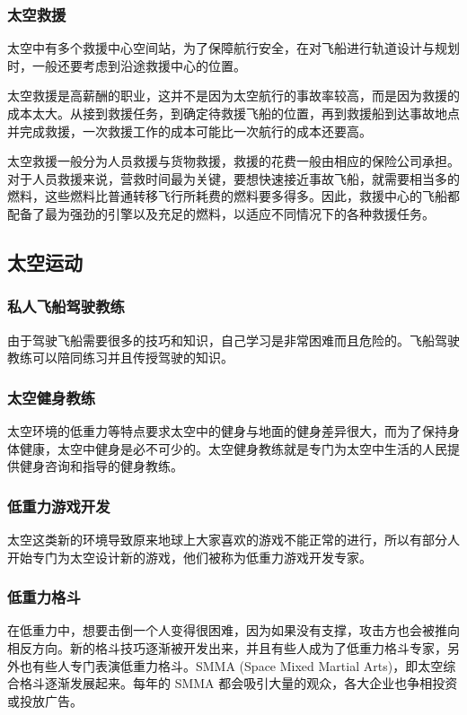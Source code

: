 \documentclass[letterpaper,10pt]{sphinxmanual}
\begin{document}
\subsubsection{太空救援}
\label{profession:id10}
太空中有多个救援中心空间站，为了保障航行安全，在对飞船进行轨道设计与规划时，一般还要考虑到沿途救援中心的位置。

太空救援是高薪酬的职业，这并不是因为太空航行的事故率较高，而是因为救援的成本太大。从接到救援任务，到确定待救援飞船的位置，再到救援船到达事故地点并完成救援，一次救援工作的成本可能比一次航行的成本还要高。

太空救援一般分为人员救援与货物救援，救援的花费一般由相应的保险公司承担。对于人员救援来说，营救时间最为关键，要想快速接近事故飞船，就需要相当多的燃料，这些燃料比普通转移飞行所耗费的燃料要多得多。因此，救援中心的飞船都配备了最为强劲的引擎以及充足的燃料，以适应不同情况下的各种救援任务。


\subsection{太空运动}
\label{profession:id11}

\subsubsection{私人飞船驾驶教练}
\label{profession:id12}
由于驾驶飞船需要很多的技巧和知识，自己学习是非常困难而且危险的。飞船驾驶教练可以陪同练习并且传授驾驶的知识。


\subsubsection{太空健身教练}
\label{profession:id13}
太空环境的低重力等特点要求太空中的健身与地面的健身差异很大，而为了保持身体健康，太空中健身是必不可少的。太空健身教练就是专门为太空中生活的人民提供健身咨询和指导的健身教练。


\subsubsection{低重力游戏开发}
\label{profession:id14}
太空这类新的环境导致原来地球上大家喜欢的游戏不能正常的进行，所以有部分人开始专门为太空设计新的游戏，他们被称为低重力游戏开发专家。


\subsubsection{低重力格斗}
\label{profession:id15}
在低重力中，想要击倒一个人变得很困难，因为如果没有支撑，攻击方也会被推向相反方向。新的格斗技巧逐渐被开发出来，并且有些人成为了低重力格斗专家，另外也有些人专门表演低重力格斗。SMMA (Space Mixed Martial Arts)，即太空综合格斗逐渐发展起来。每年的 SMMA 都会吸引大量的观众，各大企业也争相投资或投放广告。
\end{document}
